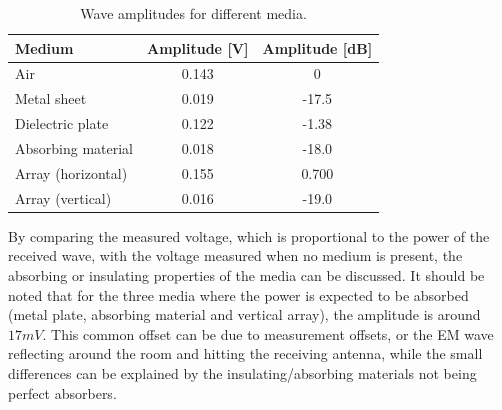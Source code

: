 \begin{table}[h]
\centering
\caption{Wave amplitudes for different media.}
\label{tab:Ass1_3}
\begin{tabular}{|l|c|c|}
\hline
Medium             & \multicolumn{1}{l|}{Amplitude {[}V{]}} & \multicolumn{1}{l|}{Amplitude {[}dB{]}} \\ \hline
Air                & 0.143                                  & 0                                       \\ \hline
Metal sheet        & 0.019                                  & -17.5                                   \\ \hline
Dielectric plate   & 0.122                                  & -1.38                                   \\ \hline
Absorbing material & 0.018                                  & -18.0                                   \\ \hline
Array (horizontal) & 0.155                                  & 0.700                                   \\ \hline
Array (vertical)   & 0.016                                  & -19.0                                   \\ \hline
\end{tabular}
\end{table}

By comparing the measured voltage, which is proportional to the power of the received wave, with the voltage measured when no medium is present, the absorbing or insulating properties of the media can be discussed. It should be noted that for the three media where the power is expected to be absorbed (metal plate, absorbing material and vertical array), the amplitude is around $17mV$. This common offset can be due to measurement offsets, or the EM wave reflecting around the room and hitting the receiving antenna, while the small differences can be explained by the insulating/absorbing materials not being perfect absorbers.

